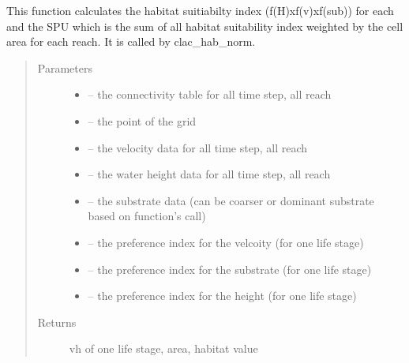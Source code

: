\documentclass[letterpaper,10pt,english]{sphinxmanual}
\begin{document}

\begin{fulllineitems}
\label{\detokenize{index:src.calcul_hab.calc_hab_norm}}
This function calculates the habitat suitiabilty index (f(H)xf(v)xf(sub)) for each and the SPU which is the sum of
all habitat suitability index weighted by the cell area for each reach. It is called by clac\_hab\_norm.
\begin{quote}\begin{description}
\item[{Parameters}] \leavevmode\begin{itemize}
\item {} 
 -- the connectivity table for all time step, all reach

\item {} 
 -- the point of the grid

\item {} 
 -- the velocity data for all time step, all reach

\item {} 
 -- the water height data for all time step, all reach

\item {} 
 -- the substrate data (can be coarser or dominant substrate based on function's call)

\item {} 
 -- the preference index for the velcoity (for one life stage)

\item {} 
 -- the preference index for the substrate  (for one life stage)

\item {} 
 -- the preference index for the height  (for one life stage)

\end{itemize}

\item[{Returns}] \leavevmode
vh of one life stage, area, habitat value

\end{description}\end{quote}

\end{fulllineitems}
\end{document}
